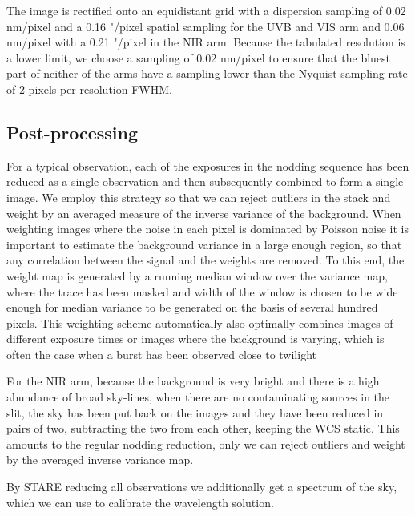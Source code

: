 \documentclass{aa}    %
\begin{document}
The image is rectified onto an equidistant grid with a dispersion sampling of
0.02 nm/pixel and a 0.16 "/pixel spatial sampling for the UVB and VIS arm and
0.06 nm/pixel with a 0.21 "/pixel in the NIR arm.  Because the tabulated
resolution is a lower limit, we choose a sampling of 0.02 nm/pixel to ensure
that the bluest part of neither of the arms have a sampling lower than the
Nyquist sampling rate of 2 pixels per resolution FWHM.

\subsection{Post-processing} \label{postproc}

For a typical observation, each of the exposures in the nodding sequence has
been reduced as a single observation and then subsequently combined to form a
single image. We employ this strategy so that we can reject outliers in the
stack and weight by an averaged measure of the inverse variance of the
background. When weighting images where the noise in each pixel is dominated by
Poisson noise it is important to estimate the background variance in a large enough
region, so that any correlation between the signal and the weights are removed.
To this end, the weight map is generated by a running median window over the
variance map, where the trace has been masked and width of the window is chosen
to be wide enough for median variance to be generated on the basis of several
hundred pixels. This weighting scheme automatically also optimally combines
images of different exposure times or images where the background is varying,
which is often the case when a burst has been observed close to twilight

For the NIR arm, because the background is very bright and there is a high
abundance of broad sky-lines, when there are no contaminating sources in the
slit, the sky has been put back on the images and they have been reduced in
pairs of two, subtracting the two from each other, keeping the WCS static. This
amounts to the regular nodding reduction, only we can reject outliers and weight
by the averaged inverse variance map.

By STARE reducing all observations we additionally get a spectrum of the sky,
which we can use to calibrate the wavelength solution.


\end{document}
